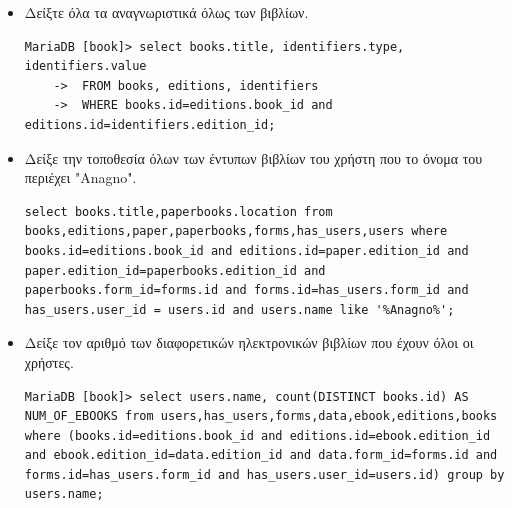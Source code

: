 \documentclass{assignment}
\begin{document}
\begin{itemize}
\item Δείξτε όλα τα αναγνωριστικά όλως των βιβλίων.
\begin{verbatim}
MariaDB [book]> select books.title, identifiers.type, identifiers.value 
    ->  FROM books, editions, identifiers 
    ->  WHERE books.id=editions.book_id and editions.id=identifiers.edition_id;
\end{verbatim}

\item Δείξε την τοποθεσία όλων των έντυπων βιβλίων του χρήστη που το όνομα του περιέχει "Anagno".
\begin{verbatim}
select books.title,paperbooks.location from books,editions,paper,paperbooks,forms,has_users,users where books.id=editions.book_id and editions.id=paper.edition_id and paper.edition_id=paperbooks.edition_id and paperbooks.form_id=forms.id and forms.id=has_users.form_id and has_users.user_id = users.id and users.name like '%Anagno%';
\end{verbatim}

\item Δείξε τον αριθμό των διαφορετικών ηλεκτρονικών βιβλίων που έχουν όλοι οι χρήστες.
\begin{verbatim}
MariaDB [book]> select users.name, count(DISTINCT books.id) AS NUM_OF_EBOOKS from users,has_users,forms,data,ebook,editions,books where (books.id=editions.book_id and editions.id=ebook.edition_id and ebook.edition_id=data.edition_id and data.form_id=forms.id and forms.id=has_users.form_id and has_users.user_id=users.id) group by users.name;
\end{verbatim}

\end{itemize}

 \label{Βιβλιογραφία}



\newpage
\end{document}
